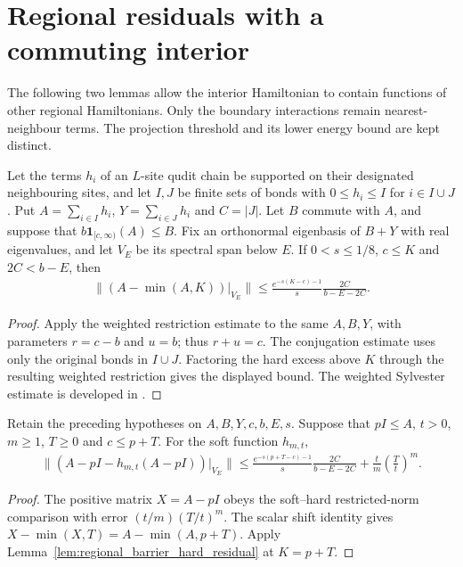 \section{Regional residuals with a commuting interior}
\label{sec:regional_barrier_residual}

The following two lemmas allow the interior Hamiltonian to contain
functions of other regional Hamiltonians. Only the boundary interactions
remain nearest-neighbour terms. The projection threshold and its lower
energy bound are kept distinct.

\begin{lemma}
    \label{lem:regional_barrier_hard_residual}
    \leanok
    Let the terms $h_i$ of an $L$-site qudit chain be supported on their
    designated neighbouring sites, and let $I,J$ be finite sets of bonds
    with $0\leq h_i\leq I$ for $i\in I\cup J$.
    Put $A=\sum_{i\in I}h_i$, $Y=\sum_{i\in J}h_i$ and $C=|J|$.
    Let $B$ commute with $A$, and suppose that
    $b\mathbf1_{[c,\infty)}(A)\leq B$.
    Fix an orthonormal eigenbasis of $B+Y$ with real eigenvalues, and
    let $V_E$ be its spectral span below $E$. If $0<s\leq1/8$,
    $c\leq K$ and $2C<b-E$, then
    \begin{align}
        \|(A-\min(A,K))|_{V_E}\|
        \leq \frac{e^{-s(K-c)-1}}{s}\frac{2C}{b-E-2C}.
    \end{align}
\end{lemma}
\begin{proof}\leanok
    Apply the weighted restriction estimate to the same $A,B,Y$,
    with parameters $r=c-b$ and $u=b$; thus $r+u=c$.
    The conjugation estimate uses only the original bonds in $I\cup J$.
    Factoring the hard excess above $K$ through the resulting weighted
    restriction gives the displayed bound. The weighted Sylvester
    estimate is developed in
    \cite[``Restricted weighted Sylvester equation'']{QICLean2026Blueprint}.
\end{proof}

\begin{lemma}
    \label{lem:regional_barrier_soft_residual}
    \leanok
    Retain the preceding hypotheses on $A,B,Y,c,b,E,s$.
    Suppose that $pI\leq A$, $t>0$, $m\geq1$, $T\geq0$ and
    $c\leq p+T$. For the soft function $h_{m,t}$,
    \begin{align}
        \|(A-pI-h_{m,t}(A-pI))|_{V_E}\|
        \leq \frac{e^{-s(p+T-c)-1}}{s}\frac{2C}{b-E-2C}
        +\frac{t}{m}\left(\frac{T}{t}\right)^m.
    \end{align}
\end{lemma}
\begin{proof}\leanok
    The positive matrix $X=A-pI$ obeys the soft--hard restricted-norm
    comparison with error $(t/m)(T/t)^m$. The scalar shift identity gives
    $X-\min(X,T)=A-\min(A,p+T)$. Apply
    Lemma~\ref{lem:regional_barrier_hard_residual} at $K=p+T$.
\end{proof}

